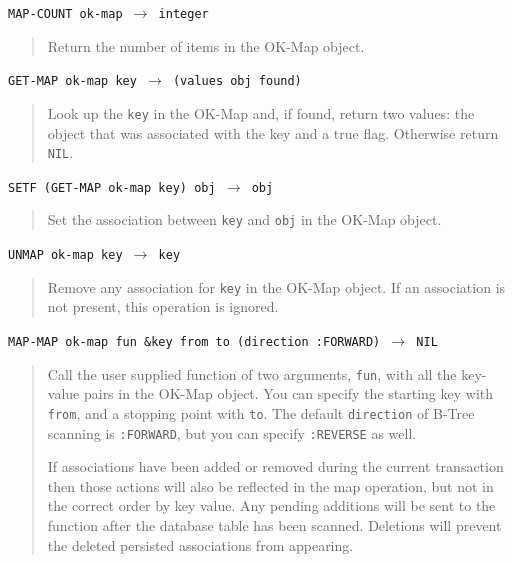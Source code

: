 \documentclass[article,oneside]{memoir}
\begin{document}
\noindent \texttt{MAP-COUNT ok-map $\rightarrow$ integer}

\begin{quote}
Return the number of items in the OK-Map object.
\end{quote}


\noindent \texttt{GET-MAP ok-map key $\rightarrow$ (values obj found)}

\begin{quote}
Look up the \texttt{key} in the OK-Map and, if found, return two values: the object that was associated with the key and a true flag. Otherwise return \texttt{NIL}.
\end{quote}

\noindent \texttt{SETF (GET-MAP ok-map key) obj $\rightarrow$ obj}

\begin{quote}
Set the association between \texttt{key} and \texttt{obj} in the OK-Map object. 
\end{quote}

\noindent \texttt{UNMAP ok-map key $\rightarrow$ key}

\begin{quote}
Remove any association for \texttt{key} in the OK-Map object. If an association is not present, this operation is ignored.
\end{quote}


\noindent \texttt{MAP-MAP ok-map fun \&key from to (direction :FORWARD) $\rightarrow$ NIL}

\begin{quote}
Call the user supplied function of two arguments, \texttt{fun}, with all the key-value pairs in the OK-Map object. You can specify the starting key with \texttt{from}, and a stopping point with \texttt{to}. The default \texttt{direction} of B-Tree scanning is \texttt{:FORWARD}, but you can specify \texttt{:REVERSE} as well.

 If associations have been added or removed during the current transaction then those actions will also be reflected in the map operation, but not in the correct order by key value. Any pending additions will be sent to the function after the database table has been scanned. Deletions will prevent the deleted persisted associations from appearing.
\end{quote}
 
\end{document}
